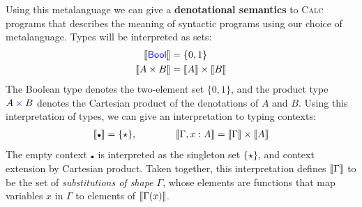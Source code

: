 Using this metalanguage we can give a \textbf{denotational semantics} to
\textsc{Calc} programs that describes the meaning of syntactic programs using 
our choice of metalanguage.
Types will be interpreted as sets:
\begin{align} \label{eqn:calc-types-in-finset}
  \left\llbracket \mathsf{{\color{blue}Bool}} \right\rrbracket &= \{0,1\} \\
  \left\llbracket {A}\times{B} \right\rrbracket &= \left\llbracket A \right\rrbracket \times \left\llbracket B \right\rrbracket
\end{align}
The Boolean type denotes the two-element set \(\{0,1\}\),
and the product type \({A}\mathbin{{\color{blue}\times}} {B}\) denotes the Cartesian product of
the denotations of \(A\) and \(B\).
Using this interpretation of types, we can give an interpretation to typing contexts:
\begin{align*}
  \dbracket{\ctxemp} = \{\star\},
  \qquad\qquad
  \dbracket{\Gamma, x : A} =  \dbracket{\Gamma} \times \dbracket{A}
\end{align*}
The empty context \(\ctxemp\) is interpreted as the singleton set \(\{\star\}\),
and context extension by Cartesian product.
Taken together, this interpretation defines \(\left\llbracket \Gamma\right\rrbracket\)
to be the set of \emph{substitutions of shape \(\Gamma\)},
whose elements are functions that map variables \(x\) in \(\Gamma\)
to elements of \(\left\llbracket \Gamma(x)\right\rrbracket\).


